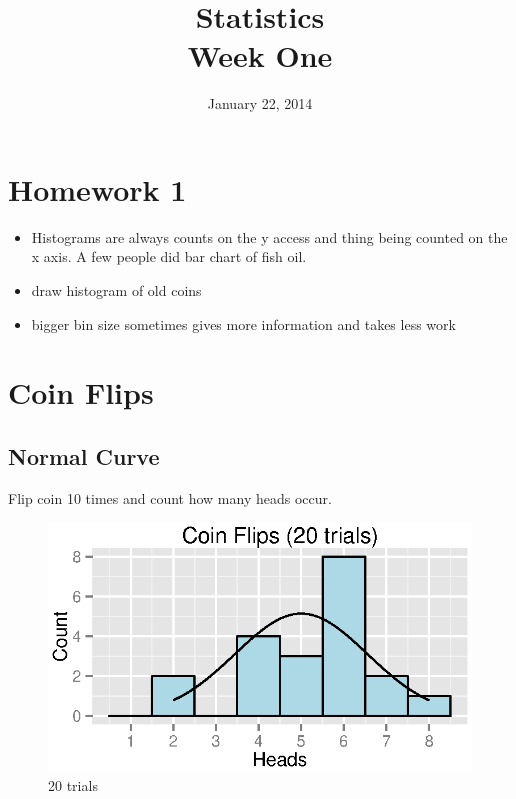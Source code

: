 \documentclass{exam}
\author{}
\date{January 22, 2014}
\title{Statistics \\ Week One}
\begin{document}
  \maketitle
  \tableofcontents
  \section{Homework 1}

  \begin{itemize}
    \item Histograms are always counts on the y access and thing being counted on the x
      axis.   A few people did bar chart of fish oil.

    \item draw histogram of old coins

    \item bigger bin size sometimes gives more information and takes less work
  \end{itemize}

  \section{Coin Flips}

  \subsection{Normal Curve}
  Flip coin 10 times and count how many heads occur.

  \begin{figure}[H]
    \centering
    \includegraphics{figures/coins/20_10.eps}
    \caption{20 trials}
  \end{figure}
\end{document}
